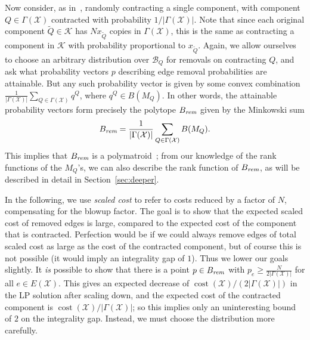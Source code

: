 \documentclass[11pt, letterpaper]{article}
\theoremstyle{definition}
\DeclareMathOperator{\cost}{cost}
\newcommand{\grphx}{\mathcal{X}}
\newcommand{\compof}[1]{\Gamma(#1)}
\newcommand{\comp}{\mathcal{K}}
\newcommand{\compx}{\compof{\grphx}}
\newcommand{\remP}{B_{\text{\it rem}}}
\newcommand{\card}[1]{\lvert#1\rvert}
\begin{document}
Now consider, as in~\cite{byrka_2010_improved}, randomly contracting a single component, with component $Q \in \compx$ contracted with probability $1/\card{\compx}$.
Note that since each original component $\tilde{Q} \in \comp$ has $Nx_{\tilde{Q}}$ copies in $\compx$, this is the same as contracting a component in $\comp$ with probability proportional to $x_{\tilde{Q}}$.
Again, we allow ourselves to choose an arbitrary distribution over $\mathcal{B}_Q$ for removals on contracting $Q$, and ask what probability vectors $p$ describing edge removal probabilities are attainable.
But any such probability vector is given by some convex combination $\tfrac{1}{\card{\compx}}\sum_{Q \in \compx} q^Q$, where $q^Q \in B(M_Q)$. 
In other words, the attainable probability vectors form precisely the polytope $\remP$ given by the Minkowski sum
\[ \remP = \frac{1}{\card{\compx}}\sum_{Q \in \compx} B(M_Q). \]
This implies that $\remP$ is a polymatroid~\cite{mcdiarmid_1975_rados}; from our knowledge of the rank functions of the $M_Q$'s, we can also describe the rank function of $\remP$, as will be described in detail in Section~\ref{sec:deeper}.

In the following, we use \emph{scaled cost} to refer to costs reduced by a factor of $N$, compensating for the blowup factor.
The goal is to show that the expected scaled cost of removed edges is large, compared to the expected cost of the component that is contracted.
Perfection would be if we could always remove edges of total scaled cost as large as the cost of the contracted component, but of course this is not possible (it would imply an integrality gap of $1$).
Thus we lower our goals slightly.
It \emph{is} possible to show that there is a point $p \in \remP$ with $p_e \geq \tfrac{N}{2\card{\compx}}$ for all $e \in E(\grphx)$.
This gives an expected decrease of $\cost(\grphx)/(2\card{\compx})$ in the LP solution after scaling down, and the expected cost of the contracted component is $\cost(\grphx)/\card{\compx}$; so this implies only an uninteresting bound of $2$ on the integrality gap.
Instead, we must choose the distribution more carefully.
\end{document}
